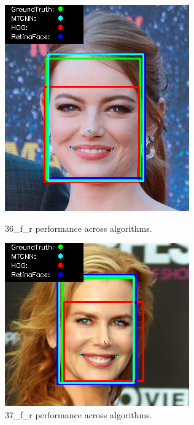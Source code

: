 \documentclass{l4proj}
\begin{document}
\begin{appendices}
\begin{figure}[h!]
  \centering
  \begin{minipage}{0.49\textwidth}
    \centering
     \includegraphics[width=\textwidth]{images/appendix/36.png}
    \caption{36\_f\_r performance across algorithms.}
    \label{whoopi_result}
  \end{minipage}
    \hfill
    \begin{minipage}{0.49\textwidth}
    \centering
     \includegraphics[width=\textwidth]{images/appendix/37.png}
    \caption{37\_f\_r performance across algorithms.}
    \label{whoopi_result}
  \end{minipage}
\end{figure}


\end{appendices}
\end{document}
